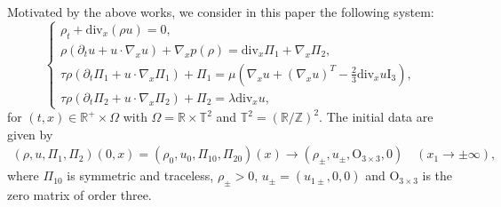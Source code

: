 \documentclass[10pt,reqno]{amsart}
\numberwithin{equation}{section}
\newcommand{\ddiv}{\mathrm{div}}
\begin{document}
Motivated by the above works, we consider in this paper the following system:
\begin{equation}\label{x1.6}
\begin{cases}
\rho_t+\ddiv_x(\rho u)=0,\\
 \rho(\partial_t u+ u\cdot\nabla_x u) +\nabla_x p(\rho)=\ddiv_x \Pi_1+\nabla_x\Pi_2,\\
\tau \rho \left(\partial_t\Pi_1+ u\cdot\nabla_x \Pi_1\right)+\Pi_1=
   \mu\left(\nabla_x u+(\nabla_x u)^T-\frac{2}{3}\ddiv_x u \mathrm{I}_3\right),\\
\tau \rho \left(\partial_t\Pi_2+ u\cdot\nabla_x \Pi_2\right)+\Pi_2=\lambda\ddiv_x u,
\end{cases}
\end{equation}
for $(t, x)\in \mathbb R^+\times \Omega$ with $\Omega=\mathbb R\times \mathbb T^2$ and $\mathbb T^2=(\mathbb R/\mathbb Z)^2$. The initial data are given by
\begin{align} \label{1.7}
(\rho, u, \Pi_1, \Pi_2)(0,x)=(\rho_0, u_0, \Pi_{10}, \Pi_{20})(x)
\rightarrow(\rho_{\pm}, u_{\pm}, \mathrm O_{3\times3}, 0) \quad (x_1\rightarrow\pm\infty),
\end{align}
where $\Pi_{10}$ is symmetric and traceless, $\rho_\pm>0$, $u_\pm=(u_{1\pm}, 0, 0)$ and $\mathrm O_{3\times3}$ is the zero matrix of order three. %
\end{document}

